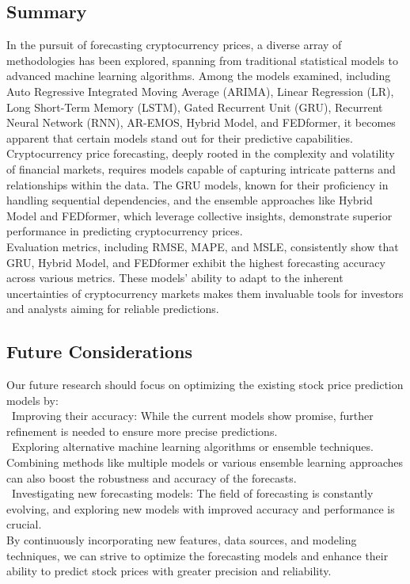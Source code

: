 \documentclass{ieeeojies}
\begin{document}
\subsection{Summary}
In the pursuit of forecasting cryptocurrency prices, a diverse array of methodologies has been explored, spanning from traditional statistical models to advanced machine learning algorithms. Among the models examined, including Auto Regressive Integrated Moving Average (ARIMA), Linear Regression (LR), Long Short-Term Memory (LSTM), Gated Recurrent Unit (GRU), Recurrent Neural Network (RNN), AR-EMOS, Hybrid Model, and FEDformer, it becomes apparent that certain models stand out for their predictive capabilities.\\
Cryptocurrency price forecasting, deeply rooted in the complexity and volatility of financial markets, requires models capable of capturing intricate patterns and relationships within the data. The GRU models, known for their proficiency in handling sequential dependencies, and the ensemble approaches like Hybrid Model and FEDformer, which leverage collective insights, demonstrate superior performance in predicting cryptocurrency prices.\\
Evaluation metrics, including RMSE, MAPE, and MSLE, consistently show that GRU, Hybrid Model, and FEDformer exhibit the highest forecasting accuracy across various metrics. These models' ability to adapt to the inherent uncertainties of cryptocurrency markets makes them invaluable tools for investors and analysts aiming for reliable predictions.
\subsection{Future Considerations}
Our future research should focus on optimizing the existing stock price prediction models by:
\\
\indent\textbullet\ 
Improving their accuracy: While the current models show promise, further refinement is needed to ensure more precise predictions.\\
\indent\textbullet\ Exploring alternative machine learning algorithms or ensemble techniques. Combining methods like multiple models or various ensemble learning approaches can also boost the robustness and accuracy of the forecasts.\\
\indent\textbullet\ Investigating new forecasting models: The field of forecasting is constantly evolving, and exploring new models with improved accuracy and performance is crucial.\\
By continuously incorporating new features, data sources, and modeling techniques, we can strive to optimize the forecasting models and enhance their ability to predict stock prices with greater precision and reliability.
\end{document}
